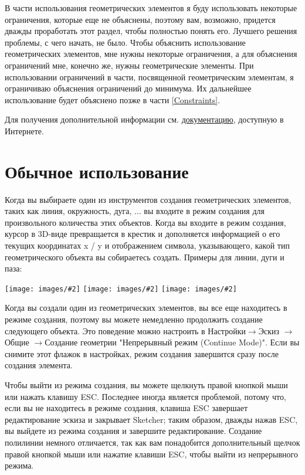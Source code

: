 \documentclass[12pt,titlepage]{article}
\newcommand{\menu}{\mbox{$\rightarrow$}}
\newcommand{\img}[2]{\vspace{2ex}\noindent\texttt{[image: images/\#2]}}
\begin{document}
В части использования геометрических элементов я буду использовать некоторые ограничения, которые еще не объяснены, поэтому вам, возможно, придется дважды проработать этот раздел, чтобы полностью понять его. Лучшего решения проблемы, с чего начать, не было. Чтобы объяснить использование геометрических элементов, мне нужны некоторые ограничения, а для объяснения ограничений мне, конечно же, нужны геометрические элементы. При использовании ограничений в части, посвященной геометрическим элементам, я ограничиваю объяснения ограничений до минимума. Их дальнейшее использование будет объяснено позже в части \vref{Constraints}.

Для получения дополнительной информации см.
\href {https://www.freecadweb.org/wiki/Sketcher_Workbench} {документацию}, доступную в Интернете.

\section{Обычное использование}
Когда вы выбираете один из инструментов создания геометрических элементов, таких как линия, окружность, дуга, ... вы входите в режим создания для произвольного количества этих объектов. Когда вы входите в режим создания, курсор в 3D-виде превращается в крестик и дополняется информацией о его текущих координатах x / y и отображением символа, указывающего, какой тип геометрического объекта вы собираетесь создать. Примеры для линии, дуги и паза:

\img{width=0.3\textwidth}{CursorLine}\hfill
\img{width=0.3\textwidth}{CursorArc}\hfill
\img{width=0.3\textwidth}{CursorSlot}

Когда вы создали один из геометрических элементов, вы все еще находитесь в режиме создания, поэтому вы можете немедленно продолжить создание следующего объекта. Это поведение можно настроить в Настройки\menu Эскиз \menu Общие \menu Создание геометрии "Непрерывный режим (Continue Mode)". Если вы снимите этот флажок в настройках, режим создания завершится сразу после создания элемента.

Чтобы выйти из режима создания, вы можете щелкнуть правой кнопкой мыши или нажать клавишу ESC. Последнее иногда является проблемой, потому что, если вы не находитесь в режиме создания, клавиша ESC завершает редактирование эскиза и закрывает Sketcher; таким образом, дважды нажав ESC, вы выйдете из режима создания и завершите редактирование. Создание полилинии немного отличается, так как вам понадобится дополнительный щелчок правой кнопкой мыши или нажатие клавиши ESC, чтобы выйти из непрерывного режима.
\end{document}

